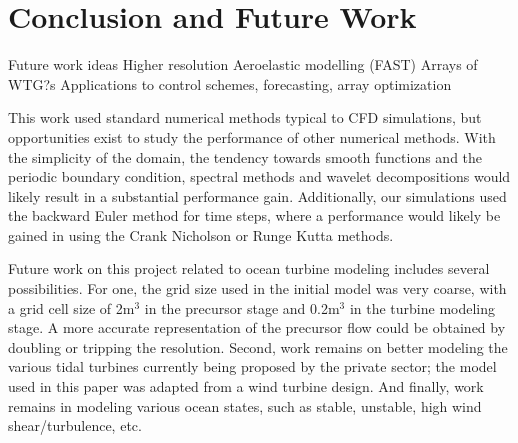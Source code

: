 \section{Conclusion and Future Work}

Future work ideas
Higher resolution
Aeroelastic modelling (FAST)
Arrays of WTG?s
Applications to control schemes, forecasting, array optimization

This work used standard numerical methods typical to CFD simulations, but opportunities exist to study the performance of other numerical methods. With the simplicity of the domain, the tendency towards smooth functions and the periodic boundary condition, spectral methods and wavelet decompositions would likely result in a substantial performance gain. Additionally, our simulations used the backward Euler method for time steps, where a performance would likely be gained in using the Crank Nicholson or Runge Kutta methods.

Future work on this project related to ocean turbine modeling includes several possibilities. For one, the grid size used in the initial model was very coarse, with a grid cell size of 2m$^3$ in the precursor stage and 0.2m$^3$ in the turbine modeling stage. A more accurate representation of the precursor flow could be obtained by doubling or tripping the resolution. Second, work remains on better modeling the various tidal turbines currently being proposed by the private sector; the model used in this paper was adapted from a wind turbine design. And finally, work remains in modeling various ocean states, such as stable, unstable, high wind shear/turbulence, etc.



